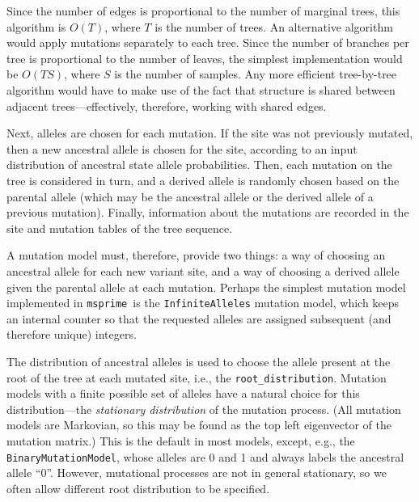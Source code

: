 \documentclass{article}
\newcommand{\msprime}[0]{\texttt{msprime}}
\begin{document}
Since the number of edges is proportional to the number of marginal trees,
this algorithm is $O(T)$,
where $T$ is the number of trees.
An alternative algorithm would apply mutations separately to each tree.
Since the number of branches per tree is proportional to the number of leaves,
the simplest implementation would be $O(T S)$,
where $S$ is the number of samples.
Any more efficient tree-by-tree algorithm would have to make use of the fact
that structure is shared between adjacent trees---effectively, therefore,
working with shared edges.

Next, alleles are chosen for each mutation.
If the site was not previously mutated, then a new ancestral allele is chosen for the site,
according to an input distribution of ancestral state allele probabilities.
Then, each mutation on the tree is considered in turn,
and a derived allele is randomly chosen based on the parental allele
(which may be the ancestral allele or the derived allele of a previous mutation).
Finally, information about the mutations are recorded in the site and mutation tables
of the tree sequence.

A mutation model must, therefore, provide two things:
a way of choosing an ancestral allele for each new variant site,
and a way of choosing a derived allele given the parental allele at each mutation.
Perhaps the simplest mutation model implemented in \msprime\ is the
\texttt{InfiniteAlleles} mutation model,
which keeps an internal counter so that the requested alleles are
assigned subsequent (and therefore unique) integers.

The distribution of ancestral alleles
is used to choose the allele present at the root of the tree at each mutated site,
i.e., the \texttt{root\_distribution}.
Mutation models with a finite possible set of alleles have a natural choice
for this distribution---the \emph{stationary distribution} of the mutation process.
(All mutation models are Markovian,
so this may be found as the top left eigenvector of the mutation matrix.)
This is the default in most models,
except, e.g., the \texttt{BinaryMutationModel}, whose alleles are 0 and 1
and always labels the ancestral allele ``0''.
However, mutational processes are not in general stationary,
so we often allow different root distribution to be specified.
\end{document}
